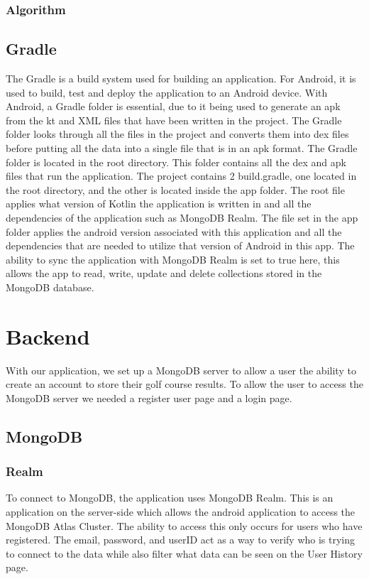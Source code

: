 \subsubsection{Algorithm}
\subsection{Gradle}
The Gradle is a build system used for building an application. For Android, it is used to build, test and deploy the application to an Android device.
\newline \newline
With Android, a Gradle folder is essential, due to it being used to generate an apk from the kt and XML files that have been written in the project. The Gradle folder looks through all the files in the project and converts them into dex files before putting all the data into a single file that is in an apk format.
\newline \newline
The Gradle folder is located in the root directory. This folder contains all the dex and apk files that run the application. The project contains 2 build.gradle, one located in the root directory, and the other is located inside the app folder. The root file applies what version of Kotlin the application is written in and all the dependencies of the application such as MongoDB Realm. \newline \newline
The file set in the app folder applies the android version associated with this application and all the dependencies that are needed to utilize that version of Android in this app. The ability to sync the application with MongoDB Realm is set to true here, this allows the app to read, write, update and delete collections stored in the MongoDB database.

\section{Backend}
With our application, we set up a MongoDB server to allow a user the ability to create an account to store their golf course results. To allow the user to access the MongoDB server we needed a register user page and a login page.
\subsection{MongoDB}
\subsubsection{Realm}
To connect to MongoDB, the application uses MongoDB Realm. This is an application on the server-side which allows the android application to access the MongoDB Atlas Cluster. The ability to access this only occurs for users who have registered. The email, password, and userID act as a way to verify who is trying to connect to the data while also filter what data can be seen on the User History page.
